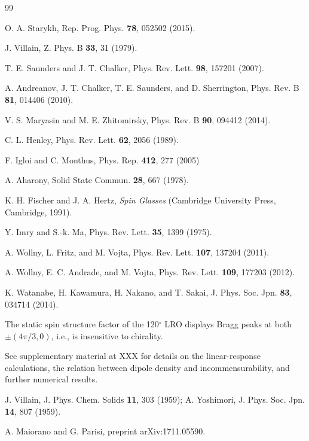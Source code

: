 \documentclass[twocolumn,english,aps,showpacs,prl,floatfix]{revtex4-1}
\begin{document}
\begin{thebibliography}{99}

O. A. Starykh,
Rep. Prog. Phys. {\bf 78}, 052502 (2015).

J. Villain,
Z. Phys. B \textbf{33}, 31 (1979).

T. E. Saunders and J. T. Chalker,
Phys. Rev. Lett. \textbf{98}, 157201 (2007).

A. Andreanov, J. T. Chalker, T. E. Saunders, and D. Sherrington,
Phys. Rev. B \textbf{81}, 014406 (2010).

V. S. Maryasin and M. E. Zhitomirsky,
Phys. Rev. B \textbf{90}, 094412 (2014).

C. L. Henley,
Phys. Rev. Lett. \textbf{62}, 2056 (1989).

F. Igloi and C. Monthus,
Phys. Rep. \textbf{412}, 277 (2005)

A. Aharony,
Solid State Commun. \textbf{28}, 667 (1978).

K. H. Fischer and J. A. Hertz, \emph{Spin Glasses}
(Cambridge University Press, Cambridge, 1991).

Y. Imry and S.-k. Ma,
Phys. Rev. Lett. \textbf{35}, 1399 (1975).

A. Wollny, L. Fritz, and M. Vojta,
Phys. Rev. Lett. {\bf 107}, 137204 (2011).

A. Wollny, E. C. Andrade, and M. Voj\-ta,
Phys. Rev. Lett. {\bf 109}, 177203 (2012).

K. Watanabe, H. Kawamura, H. Nakano, and T. Sakai,
J. Phys. Soc. Jpn. \textbf{83}, 034714 (2014).

The static spin structure factor of the 120$^\circ$ LRO displays Bragg peaks at both $\pm(4\pi/3,0)$, i.e., is insensitive to chirality.

See supplementary material at XXX for details on the linear-response calculations, the relation between dipole density and incommensurability, and further numerical results.

J. Villain, J. Phys. Chem. Solids \textbf{11}, 303 (1959);
A. Yoshimori, J. Phys. Soc. Jpn. \textbf{14}, 807 (1959).

A. Maiorano and G. Parisi,
preprint arXiv:1711.05590.

\end{thebibliography}
\end{document}
